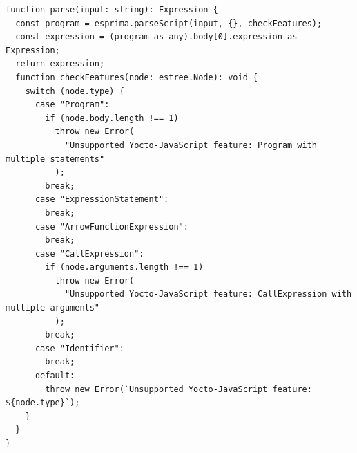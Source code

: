 \documentclass[12pt, oneside]{book}
\begin{document}
\begin{verbatim}
function parse(input: string): Expression {
  const program = esprima.parseScript(input, {}, checkFeatures);
  const expression = (program as any).body[0].expression as Expression;
  return expression;
  function checkFeatures(node: estree.Node): void {
    switch (node.type) {
      case "Program":
        if (node.body.length !== 1)
          throw new Error(
            "Unsupported Yocto-JavaScript feature: Program with multiple statements"
          );
        break;
      case "ExpressionStatement":
        break;
      case "ArrowFunctionExpression":
        break;
      case "CallExpression":
        if (node.arguments.length !== 1)
          throw new Error(
            "Unsupported Yocto-JavaScript feature: CallExpression with multiple arguments"
          );
        break;
      case "Identifier":
        break;
      default:
        throw new Error(`Unsupported Yocto-JavaScript feature: ${node.type}`);
    }
  }
}
\end{verbatim}
\end{document}
